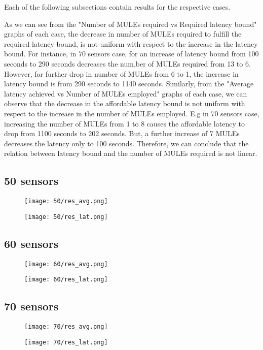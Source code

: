 Each of the following subsections contain results for the respective cases.

As we can see from the "Number of MULEs required vs Required latency bound" graphs of each case, the decrease in number of MULEs required to fulfill the required latency bound, is not uniform with respect to the increase in the latency bound. For instance, in 70 sensors case, for an increase of latency bound from 100 seconds to 290 seconds decreases the num,ber of MULEs required from 13 to 6. However, for further drop in number of MULEs from 6 to 1, the increase in latency bound is from 290 seconds to 1140 seconds. Similarly, from the "Average latency achieved vs Number of MULEs employed" graphs of each case, we can observe that the decrease in the affordable latency bound is not uniform with respect to the increase in the number of MULEs employed. E.g in 70 sensors case, increasing the number of MULEs from 1 to 8 causes the affordable latency to drop from 1100 seconds to 202 seconds. But, a further increase of 7 MULEs decreases the latency only to 100 seconds. Therefore, we can conclude that the relation between latency bound and the number of MULEs required is not linear.

\pagebreak

\subsection{50 sensors}
\begin{figure}[H]
\texttt{[image: 50/res\_avg.png]}
\end{figure}
\begin{figure}[H]
\texttt{[image: 50/res\_lat.png]}
\end{figure}
\subsection{60 sensors}
\begin{figure}[H]
\texttt{[image: 60/res\_avg.png]}
\end{figure}
\begin{figure}[H]
\texttt{[image: 60/res\_lat.png]}
\end{figure}

\subsection{70 sensors}
\begin{figure}[H]
\texttt{[image: 70/res\_avg.png]}
\end{figure}
\begin{figure}[H]
\texttt{[image: 70/res\_lat.png]}
\end{figure}

